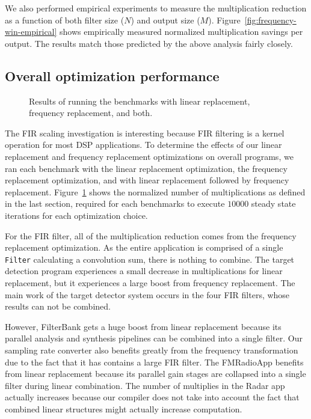 We also performed empirical experiments to measure the multiplication reduction
as a function of both filter size ($N$) and output size ($M$). 
Figure~\ref{fig:frequency-win-empirical} shows empirically measured normalized 
multiplication savings per output. The results match those predicted by the 
above analysis fairly closely.


\subsection{Overall optimization performance}

\begin{figure}
\center
\epsfxsize=3.0in
\caption{Results of running the benchmarks with linear replacement, frequency replacement, and both.}
\label{fig:linear-freq-both}
\end{figure}

The FIR scaling investigation is interesting because FIR filtering is a kernel
operation for most DSP applications. To determine the effects of our linear
replacement and frequency replacement optimizations on overall programs, we ran
each benchmark with the linear replacement optimization, the frequency replacement
optimization, and with linear replacement followed by frequency replacement. 
Figure~\ref{fig:linear-freq-both} shows the normalized number of 
multiplications as defined in the last section, required for each 
benchmarks to execute $10000$ steady state iterations for each optimization choice.

For the FIR filter, all of the multiplication reduction comes from the frequency
replacement optimization. As the entire application is comprised of a single
{\tt Filter} calculating a convolution sum, there is nothing to combine.
The target detection program experiences a small decrease in multiplications 
for linear replacement, but it experiences a large boost from frequency replacement.
The main work of the target detector system occurs in the four FIR filters, whose
results can not be combined.

However, FilterBank gets a huge boost from linear replacement because its
parallel analysis and synthesis pipelines can be combined into a single filter.
Our sampling rate converter also benefits greatly from the frequency transformation
due to the fact that it has contains a large FIR filter. The FMRadioApp
benefits from linear replacement because its parallel gain stages are collapsed
into a single filter during linear combination. The number of multiplies in the
Radar app actually increases because our compiler does not take into account the
fact that combined linear structures might actually increase computation.
